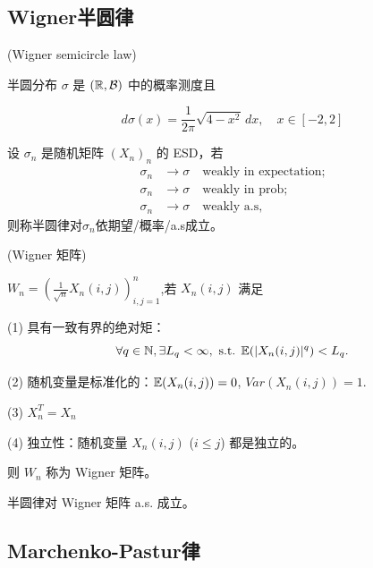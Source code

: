 \subsection{Wigner半圆律}
\begin{definition}{(Wigner semicircle law)}

    半圆分布 \(\sigma\) 是 \((\mathbb{R}, \mathcal{B})\) 中的概率测度且

\begin{equation*}
d\sigma(x) = \frac{1}{2\pi} \sqrt{4-x^2} \, dx, \quad x \in [-2, 2]
\end{equation*}
\end{definition}
\begin{definition}
    设 \(\sigma_n\) 是随机矩阵 \((X_n)_n\) 的 ESD，若
    \begin{equation*}
        \begin{aligned}
            \sigma_n &\to \sigma \quad \text{weakly in expectation;}\\
            \sigma_n &\to \sigma \quad \text{weakly in prob;}\\
            \sigma_n &\to \sigma \quad \text{weakly a.s,}
        \end{aligned}
    \end{equation*}
    则称半圆律对$\sigma_n$依期望/概率/a.s成立。
\end{definition}
\begin{definition}{(Wigner 矩阵)}

\(W_n = \left( \frac{1}{\sqrt{n}} X_n(i,j) \right)_{i,j=1}^n\),若 \(X_n(i,j)\) 满足

(1) 具有一致有界的绝对矩：
\begin{equation*}
\forall q \in \mathbb{N}, \exists L_q < \infty, \text{ s.t. } \mathbb{E}(|X_n(i,j)|^q) < L_q.
\end{equation*}

(2) 随机变量是标准化的：\(\mathbb{E}(X_n(i,j)) = 0\), \(Var(X_n(i,j)) = 1\).

(3) \(X_n^T = X_n\)

(4) 独立性：随机变量 \(X_n(i,j)\) (\(i \leq j\)) 都是独立的。

则 \(W_n\) 称为 Wigner 矩阵。
    
\end{definition}
\begin{theorem}
    半圆律对 Wigner 矩阵 a.s. 成立。
\end{theorem}

\subsection{Marchenko-Pastur律}

